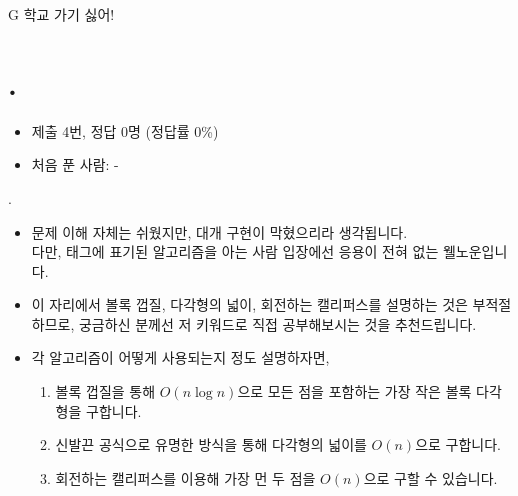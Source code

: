 
\setproblem
    {G}
    {학교 가기 싫어!}

\section{\pletter. \ptitle}

\begin{frame}[label=problem-G] %
    \sectiontitle{\pletter}{\ptitle}
    \begin{itemize}
        \item 제출 4번, 정답 0명 (정답률 0\%)
        \item 처음 푼 사람: -
    \end{itemize}
\end{frame}
\begin{frame}{\textbf{\pletter}. \ptitle}
    \begin{itemize}
        \item 문제 이해 자체는 쉬웠지만, 대개 구현이 막혔으리라 생각됩니다.\\
        다만, 태그에 표기된 알고리즘을 아는 사람 입장에선 응용이 전혀 없는 웰노운입니다.
        \item 이 자리에서 볼록 껍질, 다각형의 넓이, 회전하는 캘리퍼스를 설명하는 것은 부적절하므로,
        궁금하신 분께선 저 키워드로 직접 공부해보시는 것을 추천드립니다.
        \item 각 알고리즘이 어떻게 사용되는지 정도 설명하자면,\\
        \begin{enumerate}
            \item 볼록 껍질을 통해 $O(n \log n)$으로 모든 점을 포함하는 가장 작은 볼록 다각형을 구합니다.
            \item 신발끈 공식으로 유명한 방식을 통해 다각형의 넓이를 $O(n)$으로 구합니다.
            \item 회전하는 캘리퍼스를 이용해 가장 먼 두 점을 $O(n)$으로 구할 수 있습니다.
        \end{enumerate}
    \end{itemize}
\end{frame}
